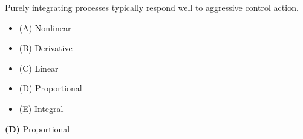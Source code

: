 

Purely integrating processes typically respond well to aggressive \underbar{\hskip 50pt} control action.

\begin{itemize}
\item{(A)} Nonlinear
\vskip 5pt 
\item{(B)} Derivative
\vskip 5pt 
\item{(C)} Linear
\vskip 5pt 
\item{(D)} Proportional
\vskip 5pt 
\item{(E)} Integral
\end{itemize}







{\bf (D)} Proportional











